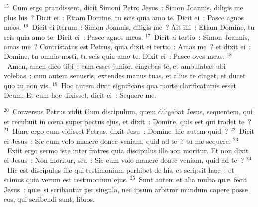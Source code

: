 ${}^{15}$~Cum ergo prandissent, dicit Simoni Petro Jesus~: Simon Joannis, diligis me plus his~? Dicit ei~: Etiam Domine, tu scis quia amo te. Dicit ei~: Pasce agnos meos.
${}^{16}$~Dicit ei iterum~: Simon Joannis, diligis me~? Ait illi~: Etiam Domine, tu scis quia amo te. Dicit ei~: Pasce agnos meos.
${}^{17}$~Dicit ei tertio~: Simon Joannis, amas me~? Contristatus est Petrus, quia dixit ei tertio~: Amas me~? et dixit ei~: Domine, tu omnia nosti, tu scis quia amo te. Dixit ei~: Pasce oves meas.
${}^{18}$~Amen, amen dico tibi~: cum esses junior, cingebas te, et ambulabas ubi volebas~: cum autem senueris, extendes manus tuas, et alius te cinget, et ducet quo tu non vis.
${}^{19}$~Hoc autem dixit significans qua morte clarificaturus esset Deum. Et cum hoc dixisset, dicit ei~: Sequere me.


${}^{20}$~Conversus Petrus vidit illum discipulum, quem diligebat Jesus, sequentem, qui et recubuit in cœna super pectus ejus, et dixit~: Domine, quis est qui tradet te~?
${}^{21}$~Hunc ergo cum vidisset Petrus, dixit Jesu~: Domine, hic autem quid~?
${}^{22}$~Dicit ei Jesus~: Sic eum volo manere donec veniam, quid ad te~? tu me sequere.
${}^{23}$~Exiit ergo sermo iste inter fratres quia discipulus ille non moritur. Et non dixit ei Jesus~: Non moritur, sed~: Sic eum volo manere donec veniam, quid ad te~?
${}^{24}$~Hic est discipulus ille qui testimonium perhibet de his, et scripsit h\ae c~: et scimus quia verum est testimonium ejus.
${}^{25}$~Sunt autem et alia multa qu\ae\ fecit Jesus~: qu\ae\ si scribantur per singula, nec ipsum arbitror mundum capere posse eos, qui scribendi sunt, libros.
